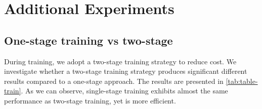 


\section{Additional Experiments}\label{appendix-exp}
\subsection{One-stage training vs two-stage}
During training, we adopt a two-stage training strategy to reduce cost. We investigate whether a two-stage training strategy produces significant different results compared to a one-stage approach. The results are presented in \autoref{tab:table-train}. As we can observe, single-stage training exhibits almost the same performance as two-stage training, yet is more efficient.


